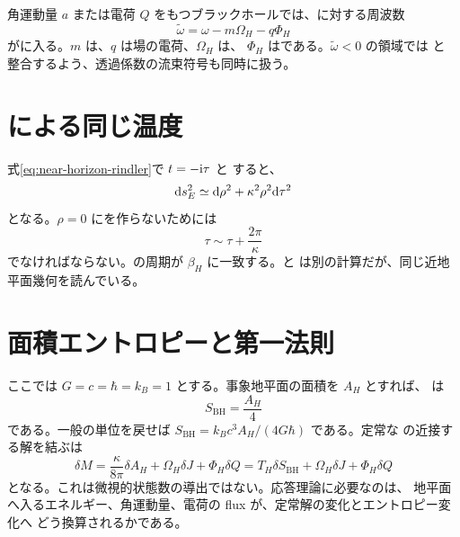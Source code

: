 角運動量 $a$ または電荷 $Q$ をもつブラックホールでは、に対する周波数
\begin{equation}
\widetilde\omega
=
\omega-m\Omega_H-q\Phi_H
\label{eq:horizon-effective-frequency}
\end{equation}
がに入る。$m$ は、$q$ は場の電荷、$\Omega_H$ は、
$\Phi_H$ はである。$\widetilde\omega<0$ の領域では  と
整合するよう、透過係数の流束符号も同時に扱う。

\section{による同じ温度}

式\eqref{eq:near-horizon-rindler}で $t=-\mathrm{i}\tau$ と すると、
\begin{equation}
\mathrm{d} s_E^2
\simeq
\mathrm{d}\rho^2
+\kappa^2\rho^2\mathrm{d}\tau^2
\end{equation}
となる。$\rho=0$ にを作らないためには
\begin{equation}
\tau
\sim
\tau+\frac{2\pi}{\kappa}
\label{eq:euclidean-period}
\end{equation}
でなければならない。の周期が $\beta_H$ に一致する。と は別の計算だが、同じ近地平面幾何を読んでいる。

\section{面積エントロピーと第一法則}

ここでは $G=c=\hbar=k_B=1$ とする。事象地平面の面積を $A_H$ とすれば、
は
\begin{equation}
S_{\mathrm{BH}}
=
\frac{A_H}{4}
\label{eq:bekenstein-hawking-entropy}
\end{equation}
である\cite{Bekenstein:1973ur,Hawking:1975vcx}。一般の単位を戻せば
$S_{\mathrm{BH}}=k_Bc^3A_H/(4G\hbar)$ である。定常な の近接する解を結ぶは
\begin{equation}
\delta M
=
\frac{\kappa}{8\pi}\delta A_H
+\Omega_H\delta J
+\Phi_H\delta Q
=
T_H\delta S_{\mathrm{BH}}
+\Omega_H\delta J
+\Phi_H\delta Q
\label{eq:black-hole-first-law}
\end{equation}
となる\cite{Bardeen:1973gs}。これは微視的状態数の導出ではない。応答理論に必要なのは、
地平面へ入るエネルギー、角運動量、電荷の flux が、定常解の変化とエントロピー変化へ
どう換算されるかである。

